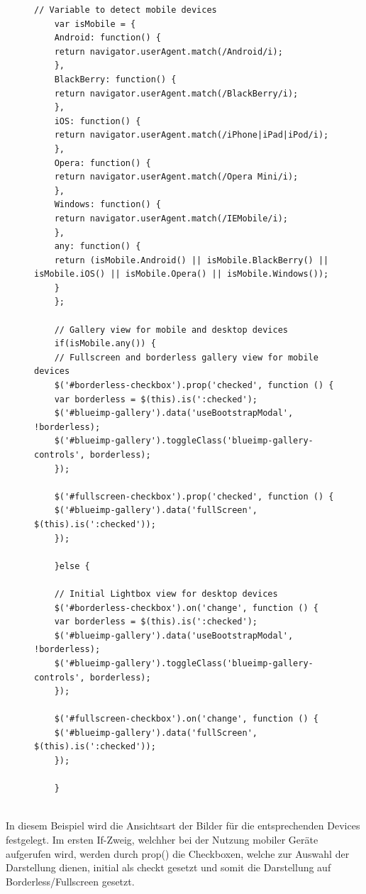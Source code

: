\begin{figure}[h]
	\begin{lstlisting}[caption={Auszug aus app.js}, label=list_client]
	// Variable to detect mobile devices
	var isMobile = {
	Android: function() {
	return navigator.userAgent.match(/Android/i);
	},
	BlackBerry: function() {
	return navigator.userAgent.match(/BlackBerry/i);
	},
	iOS: function() {
	return navigator.userAgent.match(/iPhone|iPad|iPod/i);
	},
	Opera: function() {
	return navigator.userAgent.match(/Opera Mini/i);
	},
	Windows: function() {
	return navigator.userAgent.match(/IEMobile/i);
	},
	any: function() {
	return (isMobile.Android() || isMobile.BlackBerry() || isMobile.iOS() || isMobile.Opera() || isMobile.Windows());
	}
	};
	
	// Gallery view for mobile and desktop devices
	if(isMobile.any()) {
	// Fullscreen and borderless gallery view for mobile devices
	$('#borderless-checkbox').prop('checked', function () {
	var borderless = $(this).is(':checked');
	$('#blueimp-gallery').data('useBootstrapModal', !borderless);
	$('#blueimp-gallery').toggleClass('blueimp-gallery-controls', borderless);
	});
	
	$('#fullscreen-checkbox').prop('checked', function () {
	$('#blueimp-gallery').data('fullScreen', $(this).is(':checked'));
	});
	
	}else {
	
	// Initial Lightbox view for desktop devices
	$('#borderless-checkbox').on('change', function () {
	var borderless = $(this).is(':checked');
	$('#blueimp-gallery').data('useBootstrapModal', !borderless);
	$('#blueimp-gallery').toggleClass('blueimp-gallery-controls', borderless);
	});
	
	$('#fullscreen-checkbox').on('change', function () {
	$('#blueimp-gallery').data('fullScreen', $(this).is(':checked'));
	});
	
	}
	
	\end{lstlisting}
\end{figure}

In diesem Beispiel wird die Ansichtsart der Bilder für die entsprechenden Devices 
festgelegt. Im ersten If-Zweig, welchher bei der Nutzung mobiler Geräte aufgerufen 
wird, werden durch prop() die Checkboxen, welche zur Auswahl der Darstellung 
dienen, initial als checkt gesetzt und somit die Darstellung auf Borderless/Fullscreen 
gesetzt.